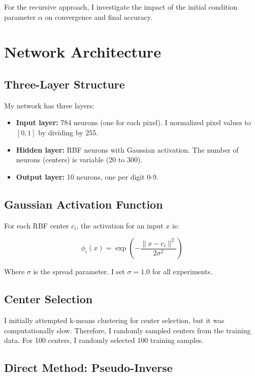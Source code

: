 \documentclass[12pt]{article}
\begin{document}
	For the recursive approach, I investigate the impact of the initial condition parameter $\alpha$ on convergence and final accuracy.
	
	\section{Network Architecture}
	
	\subsection{Three-Layer Structure}
	
	My network has three layers:
	
	\begin{itemize}
		\item \textbf{Input layer:} 784 neurons (one for each pixel). I normalized pixel values to $[0,1]$ by dividing by 255.
		\item \textbf{Hidden layer:} RBF neurons with Gaussian activation. The number of neurons (centers) is variable (20 to 300).
		\item \textbf{Output layer:} 10 neurons, one per digit 0-9.
	\end{itemize}
	
	\subsection{Gaussian Activation Function}
	
	For each RBF center $c_i$, the activation for an input $x$ is:
	
	\begin{equation}
		\phi_i(x) = \exp\left(-\frac{\|x - c_i\|^2}{2\sigma^2}\right)
		\label{eq:gaussian}
	\end{equation}
	
	Where $\sigma$ is the spread parameter. I set $\sigma = 1.0$ for all experiments.
	
	\subsection{Center Selection}
	
	I initially attempted k-means clustering for center selection, but it was computationally slow. Therefore, I randomly sampled centers from the training data. For 100 centers, I randomly selected 100 training samples.
	
	\subsection{Direct Method: Pseudo-Inverse}
	
\end{document}
